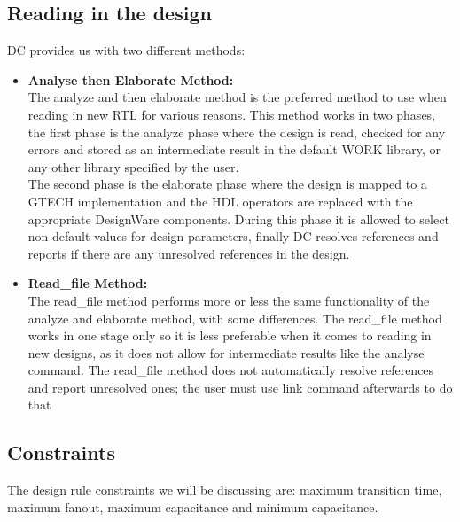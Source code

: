 \documentclass[../main.tex]{subfiles}
\begin{document}
\subsection{Reading in the design}
DC provides us with two different methods:

\begin{itemize}
\item \textbf{Analyse then Elaborate Method:}\\
The analyze and then elaborate method is the preferred method to use when reading in new RTL for various reasons. This method works in two phases, the first phase is the analyze phase where the design is read, checked for any errors and stored as an intermediate result in the default WORK library, or any other library specified by the user.\\
\newline
\noindent The second phase is the elaborate phase where the design is mapped to a GTECH 
implementation and the HDL operators are replaced with the appropriate DesignWare 
components. During this phase it is allowed to select non-default values for design 
parameters, finally DC resolves references and reports if there are any unresolved 
references in the design.

\item \textbf{Read\_file Method:}\\
The read\_file method performs more or less the same functionality of the analyze
and elaborate method, with some differences. The read\_file method works in one stage only so it is less preferable when it comes to reading in new designs, as it does not allow for intermediate results like the analyse command. The read\_file method does not automatically resolve references and report unresolved ones; the user must use link command afterwards to do that
\end{itemize}
\subsection{Constraints}
The design rule constraints we will be discussing are: maximum transition time, maximum fanout, maximum capacitance and minimum capacitance. 
\end{document}
